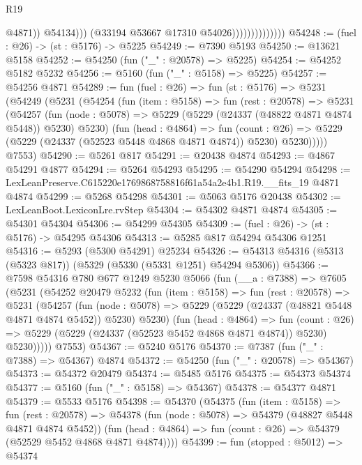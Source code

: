 \begin{lexlean}{R19}
\begin{coremodule}
                                        @4871))
                                    @54134)))
                              (@33194 @53667 @17310 @54026))))))))))))))
@54248 := (fuel : @26) -> (st : @5176) -> @5225
@54249 := @7390 @5193
@54250 := @13621 @5158
@54252 := @54250 (fun ("_" : @20578) => @5225)
@54254 := @54252 @5182 @5232
@54256 := @5160 (fun ("_" : @5158) => @5225)
@54257 := @54256 @4871
@54289 := fun (fuel : @26) =>
  fun (st : @5176) =>
  @5231
    (@54249
      (@5231
        (@54254
          (fun (item : @5158) =>
          fun (rest : @20578) =>
          @5231
            (@54257
              (fun (node : @5078) => @5229 (@5229 (@24337 (@48822 @4871 @4874 @5448)) @5230) @5230)
              (fun (head : @4864) =>
              fun (count : @26) =>
              @5229 (@5229 (@24337 (@52523 @5448 @4868 @4871 @4874)) @5230) @5230)))))
      @7553)
@54290 := @5261 @817
@54291 := @20438 @4874
@54293 := @4867 @54291 @4877
@54294 := @5264 @54293
@54295 := @54290 @54294
@54298 := LexLeanPreserve.C615220e1769868758816f61a54a2e4b1.R19.__fits_19 @4871 @4874
@54299 := @5268 @54298
@54301 := @5063 @5176 @20438
@54302 := LexLeanBoot.LexiconLre.rvStep
@54304 := @54302 @4871 @4874
@54305 := @54301 @54304
@54306 := @54299 @54305
@54309 := (fuel : @26) -> (st : @5176) -> @54295 @54306
@54313 := @5285 @817 @54294 @54306 @1251
@54316 := @5293 (@5300 @54291) @25234
@54326 := @54313 @54316 (@5313 (@5323 @817)) (@5329 (@5330 (@5331 @1251) @54294 @5306))
@54366 := @7598
    @54316
    @780
    @677
    @1249
    @5230
    @5066
    (fun (__a : @7388) =>
    @7605
      (@5231
        (@54252
          @20479
          @5232
          (fun (item : @5158) =>
          fun (rest : @20578) =>
          @5231
            (@54257
              (fun (node : @5078) =>
              @5229 (@5229 (@24337 (@48821 @5448 @4871 @4874 @5452)) @5230) @5230)
              (fun (head : @4864) =>
              fun (count : @26) =>
              @5229 (@5229 (@24337 (@52523 @5452 @4868 @4871 @4874)) @5230) @5230)))))
      @7553)
@54367 := @5240 @5176
@54370 := @7387 (fun ("_" : @7388) => @54367) @4874
@54372 := @54250 (fun ("_" : @20578) => @54367)
@54373 := @54372 @20479
@54374 := @5485 @5176
@54375 := @54373 @54374
@54377 := @5160 (fun ("_" : @5158) => @54367)
@54378 := @54377 @4871
@54379 := @5533 @5176
@54398 := @54370
    (@54375
      (fun (item : @5158) =>
      fun (rest : @20578) =>
      @54378
        (fun (node : @5078) => @54379 (@48827 @5448 @4871 @4874 @5452))
        (fun (head : @4864) => fun (count : @26) => @54379 (@52529 @5452 @4868 @4871 @4874))))
@54399 := fun (stopped : @5012) => @54374

\end{coremodule}
\end{lexlean}
